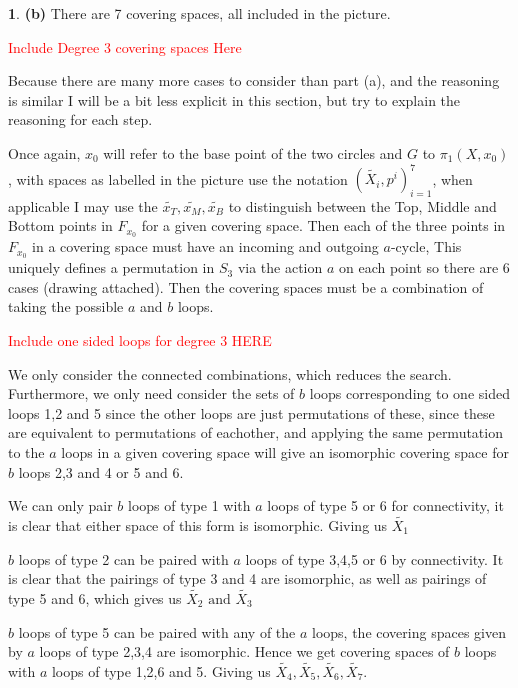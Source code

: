 \documentclass[10.5pt]{article}
\theoremstyle{definition}
\newtheorem{pb}{}
\newcommand{\tand}{\text{ and }}
\begin{document}
\begin{pb}
        \textbf{(b)} There are 7 covering spaces, all included in the picture.

        \textcolor{red}{Include Degree 3 covering spaces Here}
        
        Because there are many more cases to consider than part (a), and the reasoning is similar I will be a bit less explicit in this section, but try to explain the reasoning for each step.

        Once again, \(x_0\) will refer to the base point of the two circles and \(G\) to \(\pi_1(X,x_0)\), with spaces as labelled in the picture use the notation \((\tilde{X_i},p^i)_{i=1}^7\), when applicable I may use the \(\tilde{x_T},\tilde{x_M},\tilde{x_B}\) to distinguish between the Top, Middle and Bottom points in \(F_{x_0}\) for a given covering space. Then each of the three points in \(F_{x_0}\) in a covering space must have an incoming and outgoing \(a\)-cycle, This uniquely defines a permutation in \(S_3\) via the action \(a\) on each point so there are 6 cases (drawing attached). Then the covering spaces must be a combination of taking the possible \(a\) and \(b\) loops.

        \textcolor{red}{Include one sided loops for degree 3 HERE}

        We only consider the connected combinations, which reduces the search. Furthermore, we only need consider the sets of \(b\) loops corresponding to one sided loops 1,2 and 5 since the other loops are just permutations of these, since these are equivalent to permutations of eachother, and applying the same permutation to the \(a\) loops in a given covering space will give an isomorphic covering space for \(b\) loops 2,3 and 4 or 5 and 6.
        
        We can only pair \(b\) loops of type 1 with \(a\) loops of type 5 or 6 for connectivity, it is clear that either space of this form is isomorphic. Giving us \(\tilde{X_1}\)

        \(b\) loops of type 2 can be paired with \(a\) loops of type 3,4,5 or 6 by connectivity. It is clear that the pairings of type 3 and 4 are isomorphic, as well as pairings of type 5 and 6, which gives us \(\tilde{X_2} \tand \tilde{X_3}\)

        \(b\) loops of type 5 can be paired with any of the \(a\) loops, the covering spaces given by \(a\) loops of type 2,3,4 are isomorphic. Hence we get covering spaces of \(b\) loops with \(a\) loops of type 1,2,6 and 5. Giving us \(\tilde{X_4},\tilde{X_5},\tilde{X_6},\tilde{X_7}\).


\end{pb}
\end{document}
